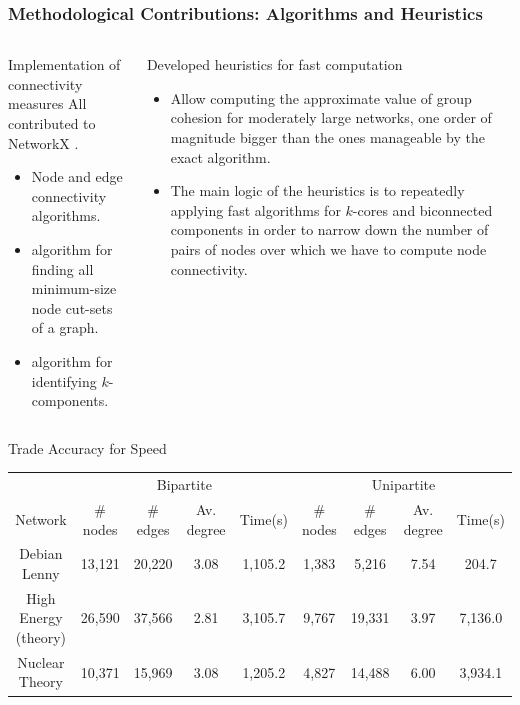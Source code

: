\documentclass[ignorenonframetext,red,8pt,notes=hide]{beamer}
\begin{document}
\begin{frame}
\frametitle{Methodological Contributions: Algorithms and Heuristics}

\begin{columns}[c]
\begin{column}{0.5\textwidth}
\begin{block}{Implementation of connectivity measures}
All contributed to NetworkX \citep{hagberg:2008}.
\begin{itemize}
\item Node and edge connectivity algorithms.
\item \citet{kanevsky:1993} algorithm for finding all minimum-size node cut-sets of a graph.
\item \citet{moody:2003} algorithm for identifying $k$-components.
\end{itemize}
\end{block}
\end{column}

\begin{column}{0.5\textwidth}
\begin{block}{Developed heuristics for fast computation}
\begin{itemize}
\item Allow computing the approximate value of group cohesion for moderately large networks, one order of magnitude bigger than the ones manageable by the exact algorithm. 
\item The main logic of the heuristics is to repeatedly applying fast algorithms for $k$-cores and biconnected components in order to narrow down the number of pairs of nodes over which we have to compute node connectivity.
\end{itemize}
\end{block}
\end{column}
\end{columns}

\pause

\begin{block}{Trade Accuracy for Speed}
\begin{tiny}
\begin{tabular}{|c|c|c|c|c|c|c|c|c|}
\hline
&\multicolumn{4}{|c|}{Bipartite}&\multicolumn{4}{|c|}{Unipartite}\\
Network&\# nodes&\# edges&Av. degree&Time(s)&\# nodes&\# edges&Av. degree&Time(s)\\
\hline
Debian Lenny&13,121&20,220&3.08&1,105.2&1,383&5,216&7.54&204.7\\
High Energy (theory)&26,590&37,566&2.81&3,105.7&9,767&19,331&3.97&7,136.0\\
Nuclear Theory&10,371&15,969&3.08&1,205.2&4,827&14,488&6.00&3,934.1\\
\hline
\end{tabular}
\end{tiny}
\end{block}

\end{frame}
\end{document}
